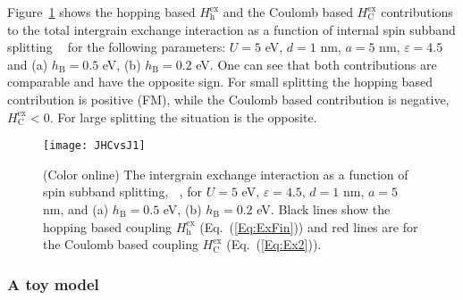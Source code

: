 \documentclass[aps,prb,amsmath,amssymb,twocolumn,superscriptaddress,showpacs,floatfix]{revtex4-1}
\DeclareMathOperator{\Ji}{\mathit J_{\mathrm{sd}}}
\begin{document}
Figure~\ref{Fig:JHCvsJ1} shows the hopping based $H^\mathrm{ex}_\mathrm{h}$ and the Coulomb based $H^\mathrm{ex}_{\mathrm C}$ contributions to the total intergrain exchange interaction as a function of internal
spin subband splitting $\Ji$ for the following parameters: $U=5$ eV, $d=1$ nm,
$a=5$ nm, $\varepsilon=4.5$ and (a) $h_\mathrm B=0.5$ eV, (b) $h_\mathrm B=0.2$ eV.
One can see that both contributions are comparable and have the
opposite sign. For small splitting the hopping based contribution is positive (FM),
while the Coulomb based contribution is negative,
$H^\mathrm{ex}_{\mathrm C}<0$. For large splitting the situation is the opposite.
\begin{figure}
\texttt{[image: JHCvsJ1]}
\caption{(Color online) The intergrain exchange interaction as a function of
spin subband splitting, $\Ji$, for $U=5$ eV, $\varepsilon=4.5$, $d=1$ nm, $a=5$ nm,
and (a) $h_\mathrm B=0.5$ eV, (b) $h_\mathrm B=0.2$ eV.
Black lines show the hopping based coupling $H^\mathrm{ex}_\mathrm{h}$ (Eq.~(\ref{Eq:ExFin})) and
red lines are for the Coulomb based coupling $H^\mathrm{ex}_{\mathrm C}$ (Eq.~(\ref{Eq:Ex2})).} \label{Fig:JHCvsJ1}
\end{figure}


\subsubsection{A toy model}
\end{document}
